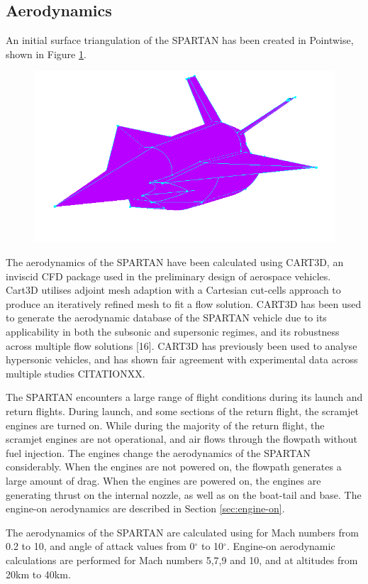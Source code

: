 		
		
		\subsection{Aerodynamics}
		An initial surface triangulation of the SPARTAN has been created in Pointwise, shown in Figure \ref{fig:Pointwise}.
		\begin{figure}
			\centering
			\includegraphics[width=0.7\linewidth]{figures/3_vehicle_design/Pointwise}
			\caption{}
			\label{fig:Pointwise}
		\end{figure}
		
		The aerodynamics of the SPARTAN have been calculated using CART3D, an inviscid CFD package used in the preliminary design of aerospace vehicles. Cart3D utilises adjoint mesh adaption with a Cartesian cut-cells approach to produce an iteratively refined mesh to fit a flow solution. CART3D has
		been used to generate the aerodynamic database of the SPARTAN vehicle due to its applicability in both the subsonic
		and supersonic regimes, and its robustness across multiple flow solutions [16]. CART3D has previously been used to
		analyse hypersonic vehicles, and has shown fair agreement with experimental data across multiple studies CITATIONXX.
		
		The SPARTAN encounters a large range of flight conditions during its launch and return flights. During launch, and some sections of the return flight, the scramjet engines are turned on. While during the majority of the return flight, the scramjet engines are not operational, and air flows through the flowpath without fuel injection. The engines change the aerodynamics of the SPARTAN considerably. When the engines are not powered on, the flowpath generates a large amount of drag. When the engines are powered on, the engines are generating thrust on the internal nozzle, as well as on the boat-tail and base. The engine-on aerodynamics are described in Section \ref{sec:engine-on}.
		
		The aerodynamics of the SPARTAN are calculated using for Mach numbers from 0.2 to 10, and angle of attack values from 0$^\circ$ to 10$^\circ$. Engine-on aerodynamic calculations are performed for Mach numbers 5,7,9 and 10, and at altitudes from 20km to 40km. 
		

